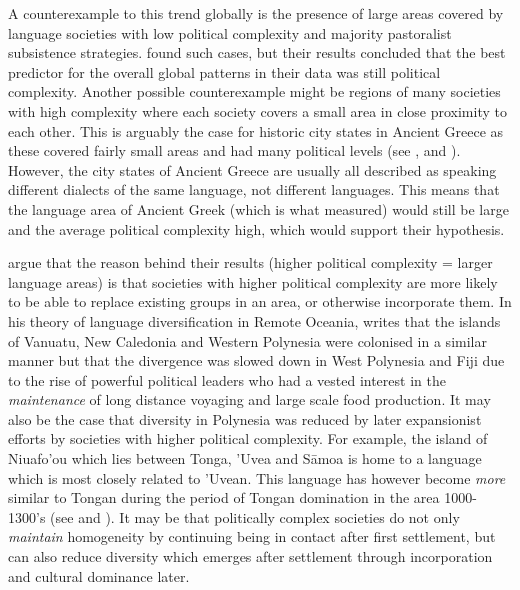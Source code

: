 \documentclass[a4paper,10pt]{article} %
\begin{document}
A counterexample to this trend globally is the presence of large areas covered by language societies with low political complexity and majority pastoralist subsistence strategies. \citet{curriemace2009} found such cases, but their results concluded that the best predictor for the overall global patterns in their data was still political complexity. Another possible counterexample might be regions of many societies with high complexity where each society covers a small area in close proximity to each other. This is arguably the case for historic city states in Ancient Greece as these covered fairly small areas and had many political levels (see \citet{cartwright_2013}, and \citet[19]{sealey1976history}). However, the city states of Ancient Greece are usually all described as speaking different dialects of the same language, not different languages. This means that the language area of Ancient Greek (which is what \citet{curriemace2009} measured) would still be large and the average political complexity high, which would support their hypothesis.

\citet{curriemace2009} argue that the reason behind their results (higher political complexity = larger language areas) is that societies with higher political complexity are more likely to be able to replace existing groups in an area, or otherwise incorporate them. In his theory of language diversification in Remote Oceania, \citet{pawley2007} writes that the islands of Vanuatu, New Caledonia and Western Polynesia were colonised in a similar manner but that the divergence was slowed down in West Polynesia and Fiji due to the rise of powerful political leaders who had a vested interest in the \emph{maintenance} of long distance voyaging and large scale food production. It may also be the case that diversity in Polynesia was reduced by later expansionist efforts by societies with higher political complexity. For example, the island of Niuafo'ou which lies between Tonga, 'Uvea and S\={a}moa is home to a language which is most closely related to 'Uvean. This language has however become \emph{more} similar to Tongan during the period of Tongan domination in the area 1000-1300's (see \citet{aswani1998tongan} and \citep[2-9]{tuskamoto_niuafoou}). It may be that politically complex societies do not only \emph{maintain} homogeneity by continuing being in contact after first settlement, but can also reduce diversity which emerges after settlement through incorporation and cultural dominance later.
\end{document}
